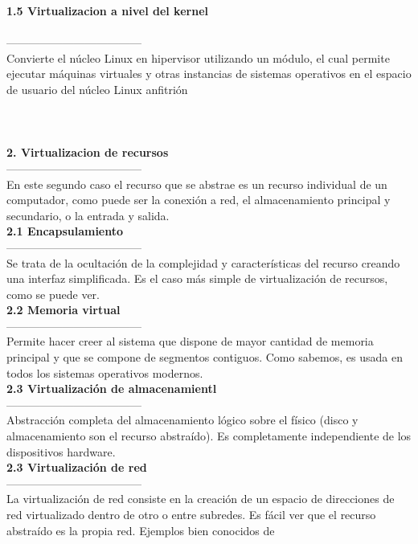 \documentclass[twoside,twocolumn]{article}
\begin{document}
\begin{flushright}
\begin{itemize}
\textbf{1.5 Virtualizacion a nivel del kernel }\\
\textbf{}\\
------------------------------------
\textbf{}\\
Convierte el núcleo Linux en hipervisor
utilizando un módulo, el cual permite ejecutar máquinas virtuales y otras
instancias de sistemas operativos en el espacio de usuario del núcleo Linux
anfitrión
\textbf{}\\
\textbf{}\\
\textbf{}\\
\textbf{}\\
 \textbf{2. Virtualizacion de recursos }\\
------------------------------------
\textbf{}\\
En este segundo caso el recurso que se abstrae es un recurso
individual de un computador, como puede ser la conexión a red, el almacenamiento
principal y secundario, o la entrada y salida.
\textbf{}\\
 \textbf{2.1  Encapsulamiento }\\
------------------------------------
\textbf{}\\
Se trata de la ocultación de la complejidad y características del
recurso creando una interfaz simplificada. Es el caso más simple de
virtualización de recursos, como se puede ver.
\textbf{}\\
 \textbf{2.2  Memoria virtual }\\
------------------------------------
\textbf{}\\
Permite hacer creer al sistema que dispone de mayor cantidad
de memoria principal y que se compone de segmentos contiguos. Como
sabemos, es usada en todos los sistemas operativos modernos. 
\textbf{}\\
\textbf{2.3  Virtualización de almacenamientl }\\
------------------------------------
\textbf{}\\
Abstracción completa del almacenamiento
lógico sobre el físico (disco y almacenamiento son el recurso abstraído). Es
completamente independiente de los dispositivos hardware.
\textbf{}\\
\textbf{2.3 Virtualización de red }\\
------------------------------------
\textbf{}\\
La virtualización de red consiste en la creación de un
espacio de direcciones de red virtualizado dentro de otro o entre subredes. Es
fácil ver que el recurso abstraído es la propia red. Ejemplos bien conocidos de

\end{itemize}
\end{flushright}
\end{document}
